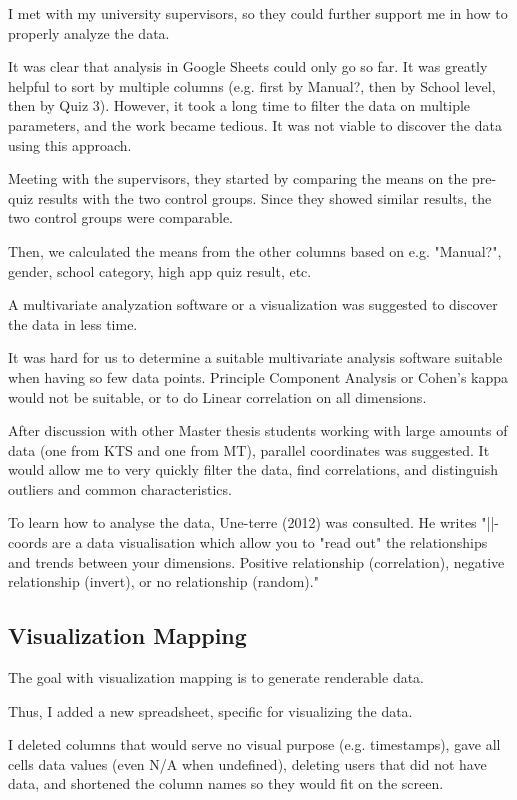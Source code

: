 I met with my university supervisors, so they could further support me in how to properly analyze the data.

It was clear that analysis in Google Sheets could only go so far. It was greatly helpful to sort by multiple columns (e.g. first by Manual?, then by School level, then by Quiz 3). However, it took a long time to filter the data on multiple parameters, and the work became tedious. It was not viable to discover the data using this approach.

Meeting with the supervisors, they started by comparing the means on the pre-quiz results with the two control groups. Since they showed similar results, the two control groups were comparable.

Then, we calculated the means from the other columns based on e.g. "Manual?", gender, school category, high app quiz result, etc.

A multivariate analyzation software or a visualization was suggested to discover the data in less time.

It was hard for us to determine a suitable multivariate analysis software suitable when having so few data points. Principle Component Analysis or Cohen's kappa would not be suitable, or to do Linear correlation on all dimensions.

After discussion with other Master thesis students working with large amounts of data (one from KTS and one from MT), parallel coordinates was suggested. It would allow me to very quickly filter the data, find correlations, and distinguish outliers and common characteristics.

To learn how to analyse the data, Une-terre (2012) was consulted. %
He writes "||-coords are a data visualisation which allow you to "read out" the relationships and trends between your dimensions. Positive relationship (correlation), negative relationship (invert), or no relationship (random)."


\subsection{Visualization Mapping}
The goal with visualization mapping is to generate renderable data.

Thus, I added a new spreadsheet, specific for visualizing the data.

I deleted columns that would serve no visual purpose (e.g. timestamps), gave all cells data values (even N/A when undefined), deleting users that did not have data, and shortened the column names so they would fit on the screen.

